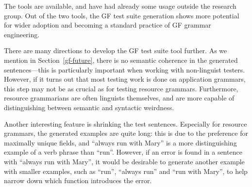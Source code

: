 
The tools are available, and have had already some usage outside the
research group. Out of the two tools, the GF test suite generation
shows more potential for wider adoption and becoming a standard
practice of GF grammar engineering.

There are many directions to develop the GF test suite tool further.
As we mention in Section~\ref{gf-future}, there is no semantic
coherence in the generated sentences---this is particularly important
when working with non-linguist testers. However, if it turns out that
most testing work is done on application grammars, this step may not
be as crucial as for testing resource grammars. Furthermore, resource
grammarians are often linguists themselves, and are more capable of
distinguishing between semantic and syntactic weirdness.

Another interesting feature is shrinking the test
sentences. Especially for resource grammars, the generated examples
are quite long: this is due to the preference for maximally unique
fields, and ``always run with Mary'' is a more distinguishing example
of a verb phrase than ``run''. However, if an error is found in a
sentence with ``always run with Mary'', it would be desirable to
generate another example with smaller examples, such as ``run'',
``always run'' and ``run with Mary'', to help narrow down which
function introduces the error.

